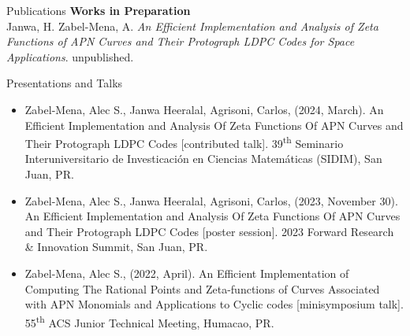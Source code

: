 \documentclass{resume} %
\begin{document}
\begin{rSection}{Publications}
    \textbf{Works in Preparation} \\
    \hspace*{10mm} Janwa, H. Zabel-Mena, A. \textit{An Efficient Implementation and Analysis of Zeta Functions of APN Curves
and Their Protograph LDPC Codes for Space Applications}.
    \hspace*{10mm} unpublished.
\end{rSection}

\begin{rSection}{Presentations and Talks}
    \begin{itemize}
        \item Zabel-Mena, Alec S., Janwa Heeralal, Agrisoni, Carlos, (2024,
          March). An Efficient Implementation and Analysis Of Zeta Functions Of
          APN Curves and Their Protograph LDPC Codes [contributed talk].
          39\textsuperscript{th} Seminario Interuniversitario de Investicaci\'on en
          Ciencias Matem\'aticas (SIDIM), San Juan, PR.

        \item Zabel-Mena, Alec S., Janwa Heeralal, Agrisoni, Carlos, (2023,
          November 30). An Efficient Implementation and Analysis Of Zeta Functions
          Of APN Curves and Their Protograph LDPC Codes [poster session]. 2023
          Forward Research & Innovation Summit, San Juan, PR.

        \item Zabel-Mena, Alec S., (2022, April). An Efficient Implementation
            of Computing The Rational Points and Zeta-functions of Curves Associated
            with APN Monomials and Applications to Cyclic codes [minisymposium
            talk]. 55\textsuperscript{th} ACS Junior Technical Meeting, Humacao,
            PR.
    \end{itemize}
\end{rSection}
\end{document}
